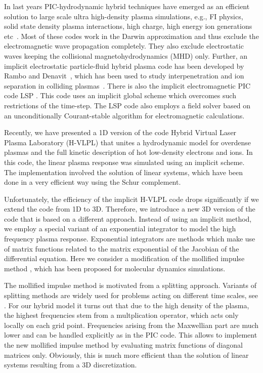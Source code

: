 \documentclass[conference]{IEEEtran}
\renewcommand{\~}{\widetilde }
\begin{document}
In last years PIC-hydrodynamic hybrid techniques have 
emerged as an efficient solution to large scale ultra high-density 
plasma simulations, e.g., FI physics, solid state 
density plasma interactions, high charge, high energy ion generations 
etc~\cite{Mason,Davies,Gremillet}. Most of these codes work in the
Darwin approximation and thus exclude the electromagnetic wave
propagation completely. They also exclude electrostatic waves keeping
the collisional magnetohydrodynamics (MHD) only. Further, an implicit 
electrostatic particle-fluid hybrid plasma code has been developed by Rambo and 
Denavit~\cite{rambo91}, which has been used to study interpenetration 
and ion separation in colliding plasmas~\cite{rambo94}. There is also the
implicit electromagnetic PIC code LSP 
\cite{LSP}. This code uses an implicit global scheme which overcomes
such restrictions of the time-step. The LSP code also employs a field
solver based on an unconditionally Courant-stable
algorithm\cite{Zheng} for electromagnetic calculations.  

Recently, we have presented a 1D version of the code  Hybrid Virtual
Laser Plasma Laboratory (H-VLPL) \cite{hvlpl} that unites a
hydrodynamic model for overdense plasmas and the full kinetic
description of hot low-density electrons and ions. In this code, the linear
plasma response was simulated using an implicit scheme. 
The implementation involved the solution of linear systems, which 
have been done in a very efficient way using the Schur complement. 

Unfortunately, the efficiency of the implicit H-VLPL code
drops significantly if we extend the code from 1D to 3D. Therefore, 
we introduce a new 3D version of the code that is based on a
different approach. Instead of using an implicit method, we employ a special
variant of an exponential integrator \cite{HocO10} to model the high frequency
plasma response. Exponential integrators are methods which make use of
matrix functions related to the matrix exponential of the
Jacobian of the differential equation. Here we consider a modification of the
mollified impulse method \cite{GarSS98}, which has been proposed for
molecular dynamics simulations.

The mollified impulse method is motivated from a splitting approach.
Variants of splitting methods are widely used for problems acting
on different time scales, see \cite{HaiLW06}. For our hybrid model it turns
out that due to the high density of the plasma, the highest frequencies stem
from a multplication operator, which acts only locally on each grid point.
Frequencies arising from the Maxwellian part are much lower and can be
handled explicitly as in the PIC code. This allows to
implement the new mollified impulse method by evaluating matrix functions
of diagonal matrices only. Obviously, this is much more efficient than
the solution of linear systems resulting from a 3D discretization.
\end{document}

